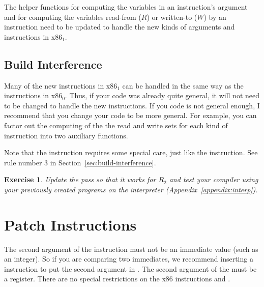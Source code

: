 \documentclass[11pt]{book}
\newtheorem{exercise}[theorem]{Exercise}
\begin{document}
The helper functions for computing the variables in an instruction's
argument and for computing the variables read-from ($R$) or written-to
($W$) by an instruction need to be updated to handle the new kinds of
arguments and instructions in x86$_1$.

\subsection{Build Interference}
\label{sec:build-interference-r2}

Many of the new instructions in x86$_1$ can be handled in the same way
as the instructions in x86$_0$. Thus, if your code was already quite
general, it will not need to be changed to handle the new
instructions. If you code is not general enough, I recommend that you
change your code to be more general. For example, you can factor out
the computing of the the read and write sets for each kind of
instruction into two auxiliary functions.

Note that the  instruction requires some special care,
just like the  instruction. See rule number 3 in
Section~\ref{sec:build-interference}.



\begin{exercise}\normalfont
Update the  pass so that it works for $R_2$
and test your compiler using your previously created programs on the
 interpreter (Appendix~\ref{appendix:interp}).
\end{exercise}


\section{Patch Instructions}

The second argument of the  instruction must not be an
immediate value (such as an integer). So if you are comparing two
immediates, we recommend inserting a  instruction to put the
second argument in .
%
The second argument of the  must be a register.
%
There are no special restrictions on the x86 instructions 
and .
\end{document}
